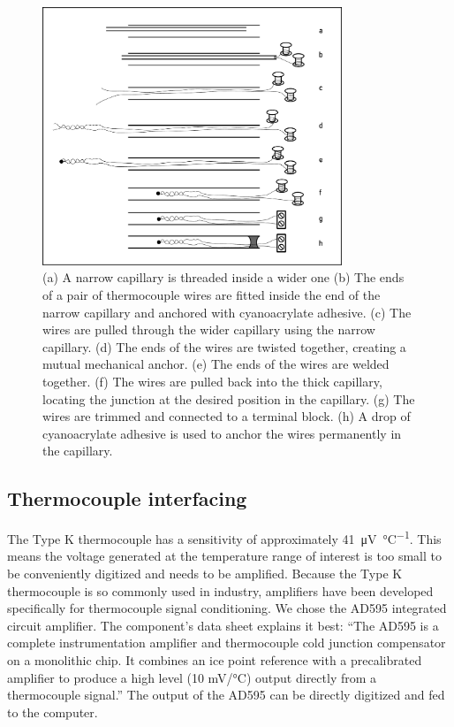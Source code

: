 \begin{figure}
	\centering
	\includegraphics[width=0.8\textwidth]{./Figures/FineWireThermocouple.pdf}
	\decoRule
	
\caption[A cartoon explaining how to construct a long, thin thermocouple
probe.]{(a) A narrow capillary is threaded inside a wider one (b) The ends of a
pair of thermocouple wires are fitted inside the end of the narrow capillary and
anchored with cyanoacrylate adhesive. (c) The wires are pulled through the
wider capillary using the narrow capillary. (d) The ends of the wires are twisted
together, creating a mutual mechanical anchor.
(e) The ends of the wires are welded together. (f) The wires are pulled back
into the thick capillary, locating the junction at the desired position in the
capillary. (g) The wires are trimmed and connected to a terminal block. (h) A
drop of cyanoacrylate adhesive is used to anchor the wires permanently in the
capillary. }
	
	\label{fig:FineWireThermocouple}
\end{figure}

\subsection{Thermocouple interfacing}

The Type K thermocouple has a sensitivity of approximately
\SI{41}{\micro\volt\per\celsius}. This means the voltage generated at the
temperature range of interest is too small to be conveniently digitized and
needs to be amplified. Because the Type K thermocouple is so commonly used in
industry, amplifiers have been developed specifically for thermocouple signal
conditioning. We chose the AD595 integrated circuit amplifier. The component's
data sheet explains it best: ``The AD595 is a complete instrumentation amplifier
and thermocouple cold junction compensator on a monolithic chip. It combines an
ice point reference with a precalibrated amplifier to produce a high level (10
mV/°C) output directly from a thermocouple signal.'' \autocite{AD595} The output
of the AD595 can be directly digitized and fed to the computer.

